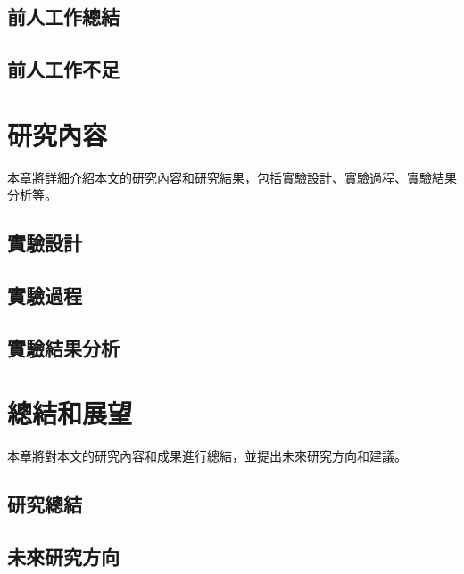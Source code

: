 \documentclass[
    writingLanguage=chinese,
    addPageTitle=yes,
    AddDeclaration=yes,
    addMUSTlog=no,
    refUnindent=yes,
    printing=no,
]{.def/must}
\begin{document}
\subsection{前人工作總結}

\txtHere[4]

\subsection{前人工作不足}

\txtHere[5]

\section{研究內容}

本章將詳細介紹本文的研究內容和研究結果，包括實驗設計、實驗過程、實驗結果分析等。

\subsection{實驗設計}

\txtHere[6]

\subsection{實驗過程}

\txtHere[7]

\subsection{實驗結果分析}

\txtHere[8]

\section{總結和展望}

本章將對本文的研究內容和成果進行總結，並提出未來研究方向和建議。

\subsection{研究總結}

\txtHere[9]

\subsection{未來研究方向}

\txtHere[10]
\end{document}
